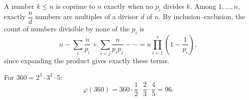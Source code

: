 A number $k\le n$ is coprime to $n$ exactly when no $p_i$ divides $k$. Among $1,\dots,n$, exactly $\dfrac{n}{d}$ numbers are multiples of a divisor $d$ of $n$. By inclusion--exclusion, the count of numbers divisible by none of the $p_i$ is
\[n-\sum_i\dfrac{n}{p_i}+\sum_{i<j}\dfrac{n}{p_ip_j}-\cdots=n\prod_{i=1}^r\left(1-\dfrac{1}{p_i}\right),\]
since expanding the product gives exactly these terms.

For $360=2^3\cdot3^2\cdot5$:
\[\varphi(360)=360\cdot\dfrac{1}{2}\cdot\dfrac{2}{3}\cdot\dfrac{4}{5}=\boxed{96}.\]
